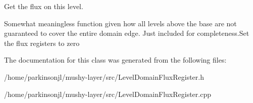 Get the flux on this level. 

Somewhat meaningless function given how all levels above the base are not guaranteed to cover the entire domain edge. Just included for completeness.\+Set the flux registers to zero 

The documentation for this class was generated from the following files\+:\begin{DoxyCompactItemize}
\item 
/home/parkinsonjl/mushy-\/layer/src/Level\+Domain\+Flux\+Register.\+h\item 
/home/parkinsonjl/mushy-\/layer/src/Level\+Domain\+Flux\+Register.\+cpp\end{DoxyCompactItemize}
